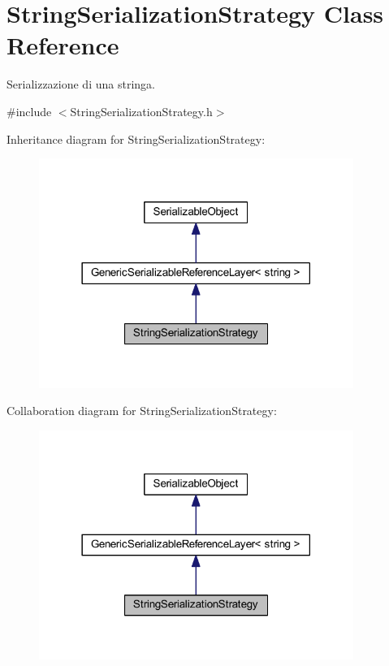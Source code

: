 \hypertarget{class_string_serialization_strategy}{
\section{StringSerializationStrategy Class Reference}
\label{class_string_serialization_strategy}
}


Serializzazione di una stringa.  




{\ttfamily \#include $<$StringSerializationStrategy.h$>$}



Inheritance diagram for StringSerializationStrategy:\nopagebreak
\begin{figure}[H]
\begin{center}
\leavevmode
\includegraphics[width=290pt]{class_string_serialization_strategy__inherit__graph}
\end{center}
\end{figure}


Collaboration diagram for StringSerializationStrategy:\nopagebreak
\begin{figure}[H]
\begin{center}
\leavevmode
\includegraphics[width=290pt]{class_string_serialization_strategy__coll__graph}
\end{center}
\end{figure}
